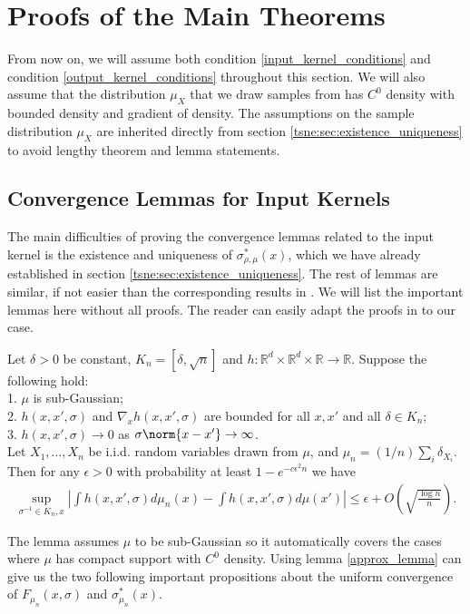 \section{Proofs of the Main Theorems} \label{tsne:sec:proofs}
From now on, we will assume both condition \ref{input_kernel_conditions} and
condition \ref{output_kernel_conditions} throughout this section. We will also
assume that the distribution $\mu_X$ that we draw samples from has $C^0$
density with bounded density and gradient of density. The assumptions on the
sample distribution $\mu_X$ are inherited directly from section
\ref{tsne:sec:existence_uniqueness} to avoid lengthy theorem and lemma
statements.
\subsection{Convergence Lemmas for Input Kernels} \label{tsne:sec:input_kernel_convergence}
The main difficulties of proving the convergence lemmas related to the input kernel is the existence and uniqueness of $\sigma^*_{\rho,\mu}(x)$, which we have already established in section \ref{tsne:sec:existence_uniqueness}. The rest of lemmas are similar, if not easier than the corresponding results in \cite{auffinger-tsne}. We will list the important lemmas here without all proofs. The reader can easily adapt the proofs in \cite{auffinger-tsne} to our case.
\begin{lemma} \label{approx_lemma}
    Let $\delta>0$ be constant, $K_n = [\delta,\sqrt{n}]$ and $h: \mathbb{R}^d \times \mathbb{R}^d \times \mathbb{R} \to \mathbb{R}$. Suppose the following hold: \\
    1. $\mu$ is sub-Gaussian; \\
    2. $h(x,x',\sigma)$ and $\nabla_x h(x,x',\sigma)$ are bounded for all $x,x'$ and all $\delta \in K_n$;\\
    3. $h(x,x',\sigma) \to 0$ as $\sigma\norm{x-x'} \to \infty$.\\
    Let $X_1,\dots,X_n$ be i.i.d. random variables drawn from $\mu$, and $\mu_n = (1/n)\sum_i \delta_{X_i}$. Then for any $\epsilon > 0$ with probability at least $1 - e^{-c\epsilon^2n}$ we have
    \begin{align}
        \sup_{\sigma^{-1} \in K_n,x} \left|\int h(x,x',\sigma)d\mu_n(x) - \int h(x,x',\sigma)d\mu(x')\right| \leq \epsilon + O\left(\sqrt{\frac{\log n}{n}}\right).
    \end{align}
\end{lemma}
The lemma assumes $\mu$ to be sub-Gaussian so it automatically covers the cases where $\mu$ has compact support with $C^0$ density. Using lemma \ref{approx_lemma} can give us the two following important propositions about the uniform convergence of $F_{\mu_n}(x,\sigma)$ and $\sigma_{\mu_n}^*(x)$.
